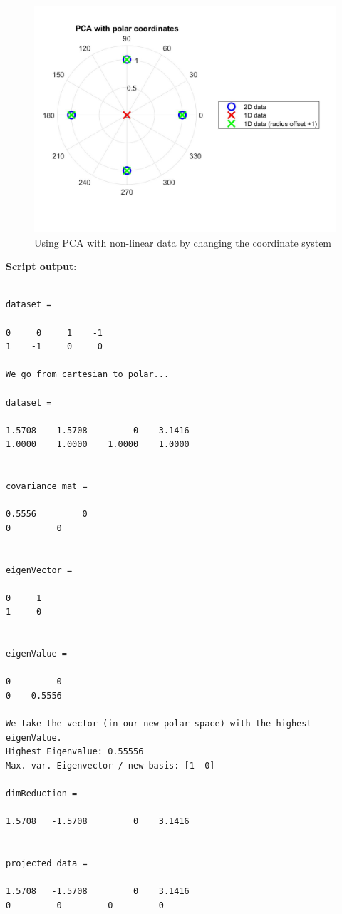 \documentclass[]{article}
\begin{document}
\pagebreak

\begin{figure}[h]
	\centering
	\includegraphics[width=\linewidth]{../img/pca-polar}
	\caption{Using PCA with non-linear data by changing the coordinate system}
	\label{fig:pca-polar}
\end{figure}

\textbf{Script output}:

\begin{verbatim}

dataset =

0     0     1    -1
1    -1     0     0

We go from cartesian to polar...

dataset =

1.5708   -1.5708         0    3.1416
1.0000    1.0000    1.0000    1.0000


covariance_mat =

0.5556         0
0         0


eigenVector =

0     1
1     0


eigenValue =

0         0
0    0.5556

We take the vector (in our new polar space) with the highest eigenValue.
Highest Eigenvalue: 0.55556
Max. var. Eigenvector / new basis: [1  0]

dimReduction =

1.5708   -1.5708         0    3.1416


projected_data =

1.5708   -1.5708         0    3.1416
0         0         0         0
\end{verbatim}
\end{document}
